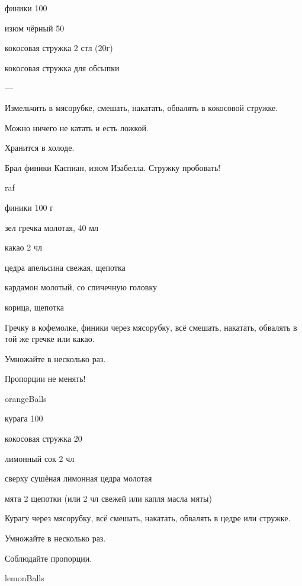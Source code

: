 {
\item финики 100
\item изюм чёрный 50
\item кокосовая стружка 2 стл (20г)
\item кокосовая стружка для обсыпки
}{
\item ---
}{
Измельчить в мясорубке, смешать, накатать, обвалять в кокосовой стружке.  
}{
\begin{advice}
\item Можно ничего не катать и есть ложкой.
    \item Хранится в холоде.
        \item Брал финики Каспиан, изюм Изабелла. Стружку пробовать!

\end{advice}
}{raf}





{
\item финики 100 г
\item зел гречка молотая, 40 мл
\item какао 2 чл
}{
\item цедра апельсина свежая, щепотка
\item кардамон молотый, со спичечную головку
\item корица, щепотка
}{
Гречку в кофемолке, финики через мясорубку, всё смешать, накатать, обвалять в той же гречке или какао.
 
}{
\begin{advice}
\item Умножайте в несколько раз.
\item Пропорции не менять!
\end{advice}}{orangeBalls}




{
\item курага 100
\item кокосовая стружка 20
\item лимонный сок 2 чл
\item сверху сушёная лимонная цедра молотая
}{
\item мята 2 щепотки (или 2 чл свежей или капля масла мяты)
}{
Курагу через мясорубку, всё смешать, накатать, обвалять в цедре или стружке. 
}{
\begin{advice}
\item Умножайте в несколько раз.
\item Соблюдайте пропорции.
\end{advice}}{lemonBalls}







